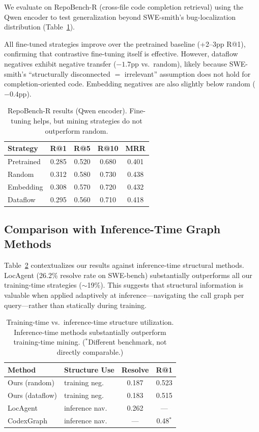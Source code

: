 \documentclass[11pt,a4paper]{article}
\begin{document}
We evaluate on RepoBench-R (cross-file code completion retrieval) using the Qwen encoder to test generalization beyond SWE-smith's bug-localization distribution (Table~\ref{tab:repobench}).

All fine-tuned strategies improve over the pretrained baseline (+2--3pp R@1), confirming that contrastive fine-tuning itself is effective.
However, dataflow negatives exhibit negative transfer ($-1.7$pp vs.\ random), likely because SWE-smith's ``structurally disconnected $=$ irrelevant'' assumption does not hold for completion-oriented code.
Embedding negatives are also slightly below random ($-0.4$pp).

\begin{table}[t]
\centering
\small
\caption{RepoBench-R results (Qwen encoder). Fine-tuning helps, but mining strategies do not outperform random.}
\label{tab:repobench}
\begin{tabular}{lcccc}
\toprule
Strategy & R@1 & R@5 & R@10 & MRR \\
\midrule
Pretrained        & 0.285 & 0.520 & 0.680 & 0.401 \\
Random            & 0.312 & 0.580 & 0.730 & 0.438 \\
Embedding         & 0.308 & 0.570 & 0.720 & 0.432 \\
Dataflow          & 0.295 & 0.560 & 0.710 & 0.418 \\
\bottomrule
\end{tabular}
\end{table}

\subsection{Comparison with Inference-Time Graph Methods}
\label{sec:inference_graph}

Table~\ref{tab:inference_compare} contextualizes our results against inference-time structural methods.
LocAgent (26.2\% resolve rate on SWE-bench) substantially outperforms all our training-time strategies (${\sim}$19\%).
This suggests that structural information is valuable when applied adaptively at inference---navigating the call graph per query---rather than statically during training.

\begin{table}[t]
\centering
\small
\caption{Training-time vs.\ inference-time structure utilization. Inference-time methods substantially outperform training-time mining. ($^*$Different benchmark, not directly comparable.)}
\label{tab:inference_compare}
\begin{tabular}{llcc}
\toprule
Method & Structure Use & Resolve & R@1 \\
\midrule
Ours (random)   & training neg.  & 0.187 & 0.523 \\
Ours (dataflow) & training neg.  & 0.183 & 0.515 \\
LocAgent        & inference nav. & 0.262 & --- \\
CodexGraph      & inference nav. & ---   & 0.48$^*$ \\
\bottomrule
\end{tabular}
\end{table}
\end{document}
